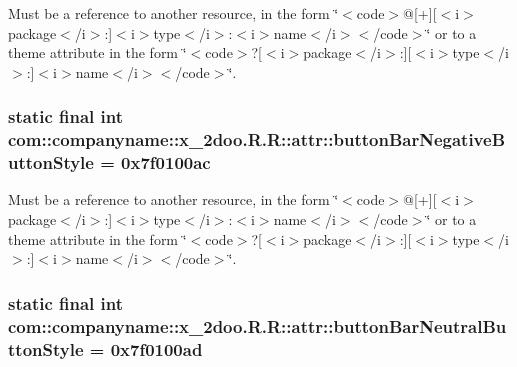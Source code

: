 Must be a reference to another resource, in the form \char`\"{}$<$code$>$@\mbox{[}+\mbox{]}\mbox{[}$<$i$>$package$<$/i$>$:\mbox{]}$<$i$>$type$<$/i$>$:$<$i$>$name$<$/i$>$$<$/code$>$\char`\"{} or to a theme attribute in the form \char`\"{}$<$code$>$?\mbox{[}$<$i$>$package$<$/i$>$:\mbox{]}\mbox{[}$<$i$>$type$<$/i$>$:\mbox{]}$<$i$>$name$<$/i$>$$<$/code$>$\char`\"{}. \hypertarget{classcom_1_1companyname_1_1x__2doo_1_1_r_1_1attr_5bfce6820b99f5e96606181469a7ac60}{
\subsubsection[{buttonBarNegativeButtonStyle}]{\setlength{\rightskip}{0pt plus 5cm}static final int com::companyname::x\_\-2doo.R.R::attr::buttonBarNegativeButtonStyle = 0x7f0100ac}}
\label{classcom_1_1companyname_1_1x__2doo_1_1_r_1_1attr_5bfce6820b99f5e96606181469a7ac60}


Must be a reference to another resource, in the form \char`\"{}$<$code$>$@\mbox{[}+\mbox{]}\mbox{[}$<$i$>$package$<$/i$>$:\mbox{]}$<$i$>$type$<$/i$>$:$<$i$>$name$<$/i$>$$<$/code$>$\char`\"{} or to a theme attribute in the form \char`\"{}$<$code$>$?\mbox{[}$<$i$>$package$<$/i$>$:\mbox{]}\mbox{[}$<$i$>$type$<$/i$>$:\mbox{]}$<$i$>$name$<$/i$>$$<$/code$>$\char`\"{}. \hypertarget{classcom_1_1companyname_1_1x__2doo_1_1_r_1_1attr_ad1d8b8ea4a7b468db52f301b3505a18}{
\subsubsection[{buttonBarNeutralButtonStyle}]{\setlength{\rightskip}{0pt plus 5cm}static final int com::companyname::x\_\-2doo.R.R::attr::buttonBarNeutralButtonStyle = 0x7f0100ad}}
\label{classcom_1_1companyname_1_1x__2doo_1_1_r_1_1attr_ad1d8b8ea4a7b468db52f301b3505a18}


